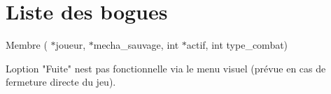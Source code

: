 \chapter{Liste des bogues}
\hypertarget{bug}{}\label{bug}

\begin{DoxyRefList}
\item[Membre \doxylink{combat_8c_a3c18ce2957ca72f56737d0082766ad63}{tour\+\_\+joueur} (\doxylink{structjoueur__t}{joueur\+\_\+t} \texorpdfstring{$\ast$}{*}joueur, \doxylink{structmechas__joueur__t}{mechas\+\_\+joueur\+\_\+t} \texorpdfstring{$\ast$}{*}mecha\+\_\+sauvage, int \texorpdfstring{$\ast$}{*}actif, int type\+\_\+combat)]\label{bug__bug000001}%
%

\begin{DoxyItemize}
\item L\textquotesingle{}option "{}\+Fuite"{} n\textquotesingle{}est pas fonctionnelle via le menu visuel (prévue en cas de fermeture directe du jeu).
\end{DoxyItemize}
\end{DoxyRefList}